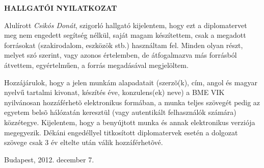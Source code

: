 

\begin{center} 
\large
\textbf{HALLGATÓI NYILATKOZAT}\\
\end{center}

Alulírott \emph{Csikós Donát}, szigorló hallgató kijelentem, hogy ezt a
diplomatervet meg nem  engedett segítség
nélkül, saját magam készítettem, csak a megadott forrásokat (szakirodalom,
eszközök stb.) használtam fel. Minden olyan részt, melyet szó szerint, vagy
azonos értelemben, de átfogalmazva más forrásból átvettem, egyértelműen, a
forrás megadásával megjelöltem.

Hozzájárulok, hogy a jelen munkám alapadatait (szerzõ(k), cím, angol és magyar
nyel\-vű tartalmi kivonat, készítés éve, konzulens(ek) neve) a BME VIK
nyilvánosan hozzáférhetõ elektronikus formában, a munka teljes szövegét pedig
az egyetem belsõ hálózatán keresztül (vagy autentikált felhasználók számára)
közzétegye. Kijelentem, hogy a benyújtott munka és annak elektronikus verziója
megegyezik. Dékáni engedéllyel titkosított diplomatervek esetén a dolgozat
szövege csak 3 év eltelte után válik hozzáférhetõvé.

\begin{flushleft}
\vspace*{1cm}
Budapest, 2012. december 7.
\end{flushleft}

\begin{flushright}
 \vspace*{1cm}
 \makebox[7cm]{\rule{6cm}{.4pt}}\\
 \\
\end{flushright}
\thispagestyle{empty}

\vfill
\clearpage
\thispagestyle{empty} %

